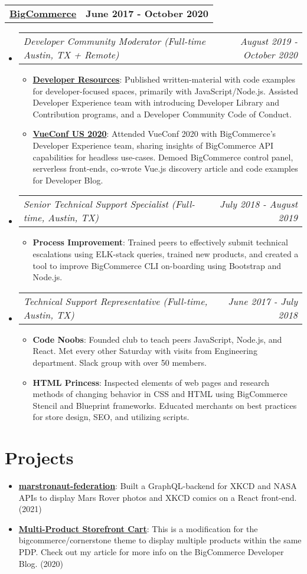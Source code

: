 \documentclass[letterpaper,10.8pt]{article}
\makeatletter
\newcommand{\resumeItem}[2]{
  \item\small{
    \textbf{#1}{: #2 \vspace{-2pt}}
  }
}
\newcommand{\jobLineItem}[2]{
  \vspace{0pt}\item[]
    \begin{tabular*}{0.98\textwidth}{l@{\extracolsep{\fill}}r}
      \textit{#1} & \textit{\small #2} \\
    \end{tabular*}\vspace{-4pt}
}
\newcommand{\employerTitle}[3]{
  \begin{tabular*}{1\textwidth}{l@{\extracolsep{\fill}}r}
    \href{#1}{\textbf{#2}} & \textbf{#3} \\
  \end{tabular*}\vspace{-4pt}
}
\newcommand{\resumeSubItem}[2]{\resumeItem{#1}{#2}\vspace{-5pt}}
\newcommand{\resumeSubHeadingListStart}{\begin{itemize}[leftmargin=*]}
\newcommand{\resumeSubHeadingListEnd}{\end{itemize}}
\newcommand{\resumeItemListStart}{\begin{itemize}}
\newcommand{\resumeItemListEnd}{\end{itemize}\vspace{-5pt}}
\makeatother
\begin{document}
  \employerTitle
    {https://bigcommerce.com}{BigCommerce}{June 2017 - October 2020}
  \resumeSubHeadingListStart
    \jobLineItem
        {Developer Community Moderator (Full-time Austin, TX + Remote)}{August 2019 - October 2020}
    \resumeItemListStart
        \resumeItem{\href{https://bigcommerce.github.io/dev-library/}{Developer Resources}}{Published written-material with code examples for developer-focused spaces, primarily with JavaScript/Node.js. Assisted Developer Experience team with introducing Developer Library and Contribution programs, and a Developer Community Code of Conduct.}
        \resumeItem{\href{https://medium.com/bigcommerce-developer-blog/introduction-to-vue-js-bigcommerce-b4388a2da4d2}{VueConf US 2020}}{Attended VueConf 2020 with BigCommerce’s Developer Experience team, sharing insights of BigCommerce API capabilities for headless use-cases. Demoed BigCommerce control panel, serverless front-ends, co-wrote Vue.js discovery article and code examples for Developer Blog.}
    \resumeItemListEnd
    \jobLineItem
        {Senior Technical Support Specialist (Full-time, Austin, TX)}{July 2018 - August 2019}
    \resumeItemListStart
        \resumeItem{Process Improvement}
        {Trained peers to effectively submit technical escalations using ELK-stack queries, trained new products, and created a tool to improve BigCommerce CLI on-boarding using Bootstrap and Node.js.}
      \resumeItemListEnd
    \jobLineItem
		    {Technical Support Representative (Full-time, Austin, TX)}{June 2017 - July 2018}
        \resumeItemListStart
        \resumeItem{Code Noobs}{Founded club to teach peers JavaScript, Node.js, and React. Met every other Saturday with visits from Engineering department. Slack group with over 50 members.}
        \resumeItem{HTML Princess}{Inspected elements of web pages and research methods of changing behavior in CSS and HTML using BigCommerce Stencil and Blueprint frameworks. Educated merchants on best practices for store design, SEO, and utilizing scripts.}
      \resumeItemListEnd
    \resumeSubHeadingListEnd

\section{Projects}
\resumeSubHeadingListStart
\resumeSubItem{\href{https:/kosenkor.in/}{marstronaut-federation}}{Built a GraphQL-backend for XKCD and NASA APIs to display Mars Rover photos and XKCD comics on a React front-end. (2021)}
\resumeSubItem{\href{https://github.com/obrien-k/multi-sf-cart}{Multi-Product Storefront Cart}}{This is a modification for the bigcommerce/cornerstone theme to display multiple products within the same PDP. Check out my article for more info on the BigCommerce Developer Blog. (2020)}
\vspace{5px}
\resumeSubHeadingListEnd

\end{document}
